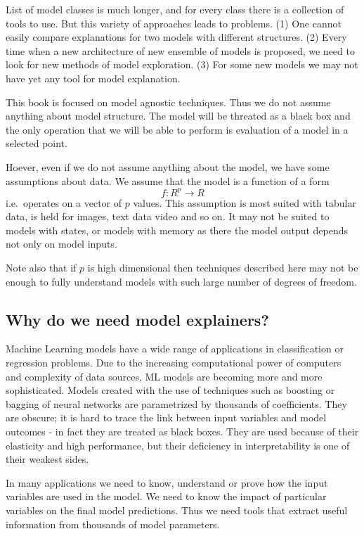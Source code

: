\documentclass[]{krantz}
\theoremstyle{definition}
\theoremstyle{definition}
\theoremstyle{definition}
\theoremstyle{remark}
\begin{document}
List of model classes is much longer, and for every class there is a
collection of tools to use. But this variety of approaches leads to
problems. (1) One cannot easily compare explanations for two models with
different structures. (2) Every time when a new architecture of new
ensemble of models is proposed, we need to look for new methods of model
exploration. (3) For some new models we may not have yet any tool for
model explanation.

This book is focused on model agnostic techniques. Thus we do not assume
anything about model structure. The model will be threated as a black
box and the only operation that we will be able to perform is evaluation
of a model in a selected point.

Hoever, even if we do not assume anything about the model, we have some
assumptions about data. We assume that the model is a function of a form
\[
f: R^p \rightarrow R
\] i.e.~operates on a vector of \(p\) values. This assumption is most
suited with tabular data, is held for images, text data video and so on.
It may not be suited to models with states, or models with memory as
there the model output depends not only on model inputs.

Note also that if \(p\) is high dimensional then techniques described
here may not be enough to fully understand models with such large number
of degrees of freedom.

\hypertarget{why-do-we-need-model-explainers}{%
\subsection{Why do we need model
explainers?}\label{why-do-we-need-model-explainers}}

Machine Learning models have a wide range of applications in
classification or regression problems. Due to the increasing
computational power of computers and complexity of data sources, ML
models are becoming more and more sophisticated. Models created with the
use of techniques such as boosting or bagging of neural networks are
parametrized by thousands of coefficients. They are obscure; it is hard
to trace the link between input variables and model outcomes - in fact
they are treated as black boxes. They are used because of their
elasticity and high performance, but their deficiency in
interpretability is one of their weakest sides.

In many applications we need to know, understand or prove how the input
variables are used in the model. We need to know the impact of
particular variables on the final model predictions. Thus we need tools
that extract useful information from thousands of model parameters.
\end{document}
